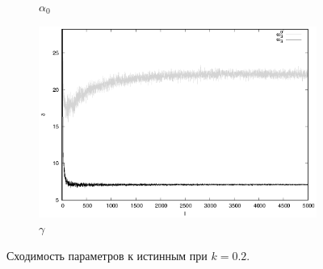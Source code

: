 \documentclass[tikz,10pt,a4paper]{article}
\begin{document}
\begin{figure}[h]
\begin{subfigure}[b]{0.35\textwidth}
	\caption{$\alpha_0$}
  \end{subfigure}%
  \begin{subfigure}[b]{0.35\textwidth}
    \includegraphics[width=\textwidth]{figs/levmar/comparison/comparison_5000_1000_xsigma0.20_float.txt_parameter3.eps}
	\caption{$\gamma$}
  \end{subfigure}
  \caption{Сходимость параметров к истинным при $k = 0.2$.}
  \label{fig:comparison_0.2}
\end{figure}
\end{document}
